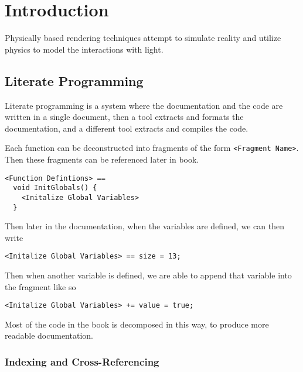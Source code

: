 \documentclass[
]{book}
\date{}
\begin{document}
\frontmatter

{
\setcounter{tocdepth}{2}
\tableofcontents
}
\mainmatter
\hypertarget{introduction}{%
\chapter{Introduction}\label{introduction}}

Physically based rendering techniques attempt to simulate reality and utilize
physics to model the interactions with light.

\hypertarget{literate-programming}{%
\section{Literate Programming}\label{literate-programming}}

Literate programming is a system where the documentation and the code are
written in a single document, then a tool extracts and formats the
documentation, and a different tool extracts and compiles the code.

Each function can be deconstructed into fragments of the form \texttt{\textless{}Fragment\ Name\textgreater{}}. Then these fragments can be referenced later in book.

\begin{verbatim}
<Function Defintions> ==
  void InitGlobals() {
    <Initalize Global Variables>
  }
\end{verbatim}

Then later in the documentation, when the variables are defined, we can then
write

\begin{verbatim}
<Initalize Global Variables> == size = 13;
\end{verbatim}

Then when another variable is defined, we are able to append that variable into
the fragment like so

\begin{verbatim}
<Initalize Global Variables> += value = true;
\end{verbatim}

Most of the code in the book is decomposed in this way, to produce more
readable documentation.

\hypertarget{indexing-and-cross-referencing}{%
\subsection{Indexing and Cross-Referencing}\label{indexing-and-cross-referencing}}
\end{document}
